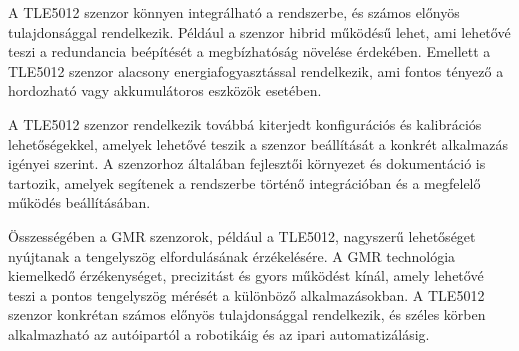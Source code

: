 A TLE5012 szenzor könnyen integrálható a rendszerbe, és számos előnyös tulajdonsággal rendelkezik. Például a szenzor hibrid működésű lehet, ami lehetővé teszi a redundancia beépítését a megbízhatóság növelése érdekében. Emellett a TLE5012 szenzor alacsony energiafogyasztással rendelkezik, ami fontos tényező a hordozható vagy akkumulátoros eszközök esetében.

A TLE5012 szenzor rendelkezik továbbá kiterjedt konfigurációs és kalibrációs lehetőségekkel, amelyek lehetővé teszik a szenzor beállítását a konkrét alkalmazás igényei szerint. A szenzorhoz általában fejlesztői környezet és dokumentáció is tartozik, amelyek segítenek a rendszerbe történő integrációban és a megfelelő működés beállításában.

Összességében a GMR szenzorok, például a TLE5012, nagyszerű lehetőséget nyújtanak a tengelyszög elfordulásának érzékelésére. A GMR technológia kiemelkedő érzékenységet, precizitást és gyors működést kínál, amely lehetővé teszi a pontos tengelyszög mérését a különböző alkalmazásokban. A TLE5012 szenzor konkrétan számos előnyös tulajdonsággal rendelkezik, és széles körben alkalmazható az autóipartól a robotikáig és az ipari automatizálásig.
